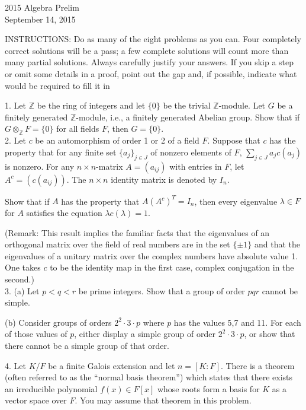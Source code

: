 \documentclass[11pt]{article}
\newcommand{\Z}{\mathbb{Z}}
\begin{document}
\begin{center}
\Large 2015 Algebra Prelim\\
\normalsize September 14, 2015
\end{center}
\vspace{1em}

INSTRUCTIONS: Do as many of the eight problems as you can. Four completely
correct solutions will be a pass; a few complete solutions will count more than many
partial solutions. Always carefully justify your answers. If you skip a step or omit
some details in a proof, point out the gap and, if possible, indicate what would be
required to fill it in\\
\vspace{1em}

1. Let $\Z$ be the ring of integers and let $\{0\}$ be the trivial $\Z$-module. Let $G$ be a finitely generated $\Z$-module,
i.e., a finitely generated Abelian group. Show that if $G\otimes_\Z F = \{0\}$ for all fields $F$, then $G = \{0\}$.\\

2. Let $c$ be an automorphism of order 1 or 2 of a field $F$. Suppose that $c$ has the property that for any finite
set $\{a_j\}_{j\in J}$ of nonzero elements of $F$, $\sum_{j\in J} a_j c(a_j)$ is nonzero. For any $n \times n$-matrix $A = (a_{ij})$ with entries
in $F$, let $A^c = (c(a_{ij}))$. The $n\times n$ identity matrix is denoted by $I_n$.

Show that if $A$ has the property that $A(A^c)^T = I_n$, then every eigenvalue $\lambda\in F$ for $A$ satisfies the equation
$\lambda c(\lambda) = 1.$

(Remark: This result implies the familiar facts that the eigenvalues of an orthogonal matrix over the field
of real numbers are in the set $\{\pm1\}$ and that the eigenvalues of a unitary matrix over the complex numbers
have absolute value 1. One takes $c$ to be the identity map in the first case, complex conjugation in the
second.)\\

3. (a) Let $p<q<r$ be prime integers. Show that a group of order $pqr$ cannot be simple.

(b) Consider groups of orders $2^2\cdot 3\cdot  p$ where $p$ has the values 5,7 and 11. For each of those values of $p$,
either display a simple group of order $2^2 \cdot 3 \cdot p$, or show that there cannot be a simple group of that order.

4. Let $K/F$ be a finite Galois extension and let $n = [K : F]$. There is a theorem (often referred to as the
“normal basis theorem”) which states that there exists an irreducible polynomial $f(x) \in F[x]$  whose roots
form a basis for $K$ as a vector space over $F$. You may assume that theorem in this problem.
\end{document}
